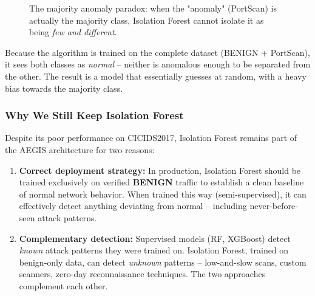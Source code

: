 \begin{figure}[H]
\centering
{}
\caption{The majority anomaly paradox: when the "anomaly" (PortScan) is actually the majority class, Isolation Forest cannot isolate it as being \textit{few and different}.}
\label{fig:majority_paradox}
\end{figure}

Because the algorithm is trained on the complete dataset (BENIGN + PortScan), it sees both classes as \textit{normal} -- neither is anomalous enough to be separated from the other. The result is a model that essentially guesses at random, with a heavy bias towards the majority class.

\subsubsection{Why We Still Keep Isolation Forest}

Despite its poor performance on CICIDS2017, Isolation Forest remains part of the AEGIS architecture for two reasons:

\begin{enumerate}
    \item \textbf{Correct deployment strategy:} In production, Isolation Forest should be trained exclusively on verified \textbf{BENIGN} traffic to establish a clean baseline of normal network behavior. When trained this way (semi-supervised), it can effectively detect anything deviating from normal -- including never-before-seen attack patterns.

    \item \textbf{Complementary detection:} Supervised models (RF, XGBoost) detect \textit{known} attack patterns they were trained on. Isolation Forest, trained on benign-only data, can detect \textit{unknown} patterns -- low-and-slow scans, custom scanners, zero-day reconnaissance techniques. The two approaches complement each other.
\end{enumerate}

